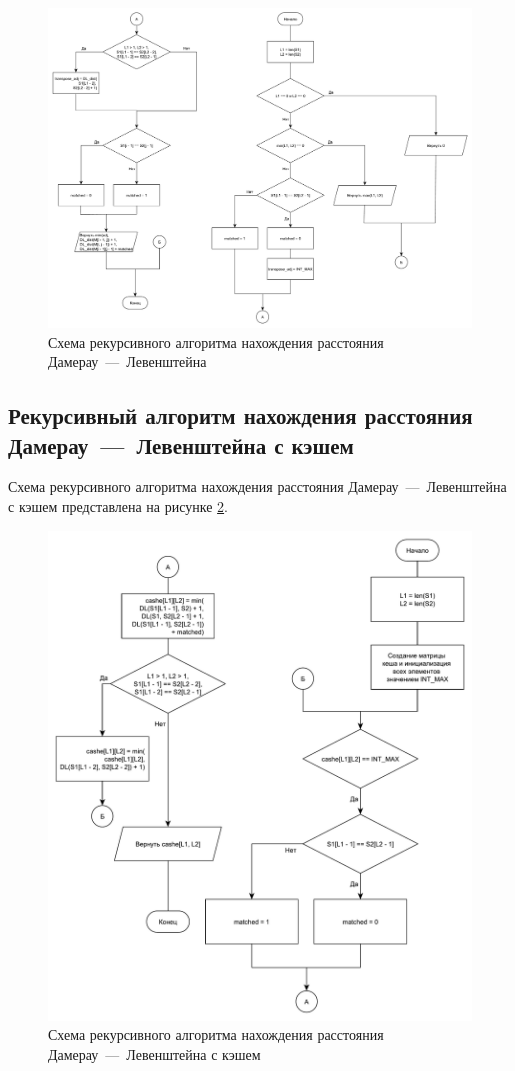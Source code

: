 \begin{figure}[h]
	\centering
	\includegraphics[scale=0.35]{images/dlev_req.pdf}
	\caption{Схема рекурсивного алгоритма нахождения расстояния Дамерау~---~Левенштейна}
	\label{img:dlev_req}
\end{figure}

\subsection{Рекурсивный алгоритм нахождения расстояния Дамерау~---~Левенштейна с кэшем}

Схема рекурсивного алгоритма нахождения расстояния Дамерау~---~Левенштейна с кэшем представлена на рисунке \ref{img:dlev_req_cache}.

\begin{figure}[h]
	\centering
	\includegraphics[scale=0.6]{images/dlev_req_cache.pdf}
	\caption{Схема рекурсивного алгоритма нахождения расстояния Дамерау~---~Левенштейна с кэшем}
	\label{img:dlev_req_cache}
\end{figure}

